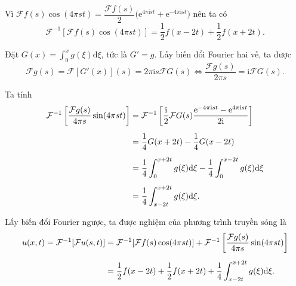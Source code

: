 \documentclass[10pt, a4paper]{article}
\begin{document}
	Vì $\mathcal Ff(s)\cos(4\pi st)=\dfrac{\mathcal Ff(s)}{2}\big(\mathrm e^{4\pi\mathrm ist}+\mathrm e^{-4\pi\mathrm ist}\big)$ nên ta có $$\mathcal F^{-1}[\mathcal Ff(s)\cos(4\pi st)]=\frac12f(x-2t)+\frac12f(x+2t).$$
	
	Đặt $G(x)=\displaystyle\int_0^xg(\xi)\mathrm d\xi$, tức là $G'=g$. Lấy biến đổi Fourier hai vế, ta được $$\mathcal Fg(s)=\mathcal F[G'(x)](s)=2\pi\mathrm is\mathcal FG(s)\iff\frac{\mathcal Fg(s)}{2\pi s}=\mathrm i\mathcal FG(s).$$
	
	Ta tính \begin{align*}
		\mathcal F^{-1}\left[\frac{\mathcal Fg(s)}{4\pi s}\sin(4\pi st)\right]&=\mathcal F^{-1}\left[\frac{\mathrm i}{2}\mathcal FG(s)\frac{\mathrm e^{-4\pi\mathrm ist}-\mathrm e^{4\pi\mathrm ist}}{2\mathrm i}\right]\\
		\noalign{\vskip5pt}
		&=\frac14G(x+2t)-\frac14G(x-2t)\\
		\noalign{\vskip5pt}
		&=\frac14\int_0^{x+2t}g(\xi)\mathrm d\xi-\frac14\int_0^{x-2t}g(\xi)\mathrm d\xi\\
		\noalign{\vskip5pt}
		&=\frac14\int_{x-2t}^{x+2t}g(\xi)\mathrm d\xi.
	\end{align*}
	
	Lấy biến đổi Fourier ngược, ta được nghiệm của phương trình truyền sóng là \begin{align*}
		u(x,t)=\mathcal F^{-1}[\mathcal Fu(s,t)]&=\mathcal F^{-1}[\mathcal Ff(s)\cos(4\pi st)]+\mathcal F^{-1}\left[\frac{\mathcal Fg(s)}{4\pi s}\sin(4\pi st)\right]\\
		\noalign{\vskip5pt}
		&=\frac12f(x-2t)+\frac12f(x+2t)+\frac14\int_{x-2t}^{x+2t}g(\xi)\mathrm d\xi.
	\end{align*}
\end{document}
